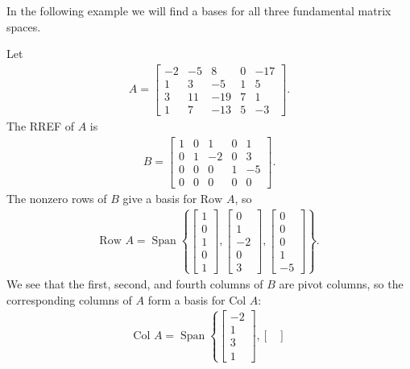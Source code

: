 \documentclass[12pt,letterpaper,reqno]{article}
\numberwithin{equation}{section}
\newcommand{\Col}{\text{Col }}
\newcommand{\Row}{\text{Row }}
\DeclareMathOperator{\Span}{Span}
\begin{document}
In the following example we will find a bases for all three fundamental matrix spaces.
\begin{example}
Let 
\begin{align*}
	A=\begin{bmatrix}
		-2 & -5 & 8 & 0 & -17 \\
		1 & 3 & -5 & 1 & 5 \\
		3 & 11 & -19 & 7 & 1 \\
		1 & 7 & -13 & 5 & -3
	\end{bmatrix}.
\end{align*}	
The RREF of $A$ is
\begin{align*}
	B=\begin{bmatrix}
		1 & 0 & 1 & 0 & 1 \\
		0 & 1 & -2 & 0 & 3 \\
		0 & 0 & 0 & 1 & -5 \\
		0 & 0 & 0 & 0 & 0
	\end{bmatrix}.
\end{align*}
The nonzero rows of $B$ give a basis for $\Row A$, so
\begin{align*}
	\Row A=\Span\left\{\begin{bmatrix}
		1 \\ 0 \\ 1 \\ 0 \\ 1
	\end{bmatrix}, \begin{bmatrix}
		0 \\ 1 \\ -2 \\ 0 \\ 3
	\end{bmatrix}, \begin{bmatrix}
		0 \\ 0 \\ 0\\ 1 \\ -5
	\end{bmatrix}\right\}.
\end{align*}
We see that the first, second, and fourth columns of $B$ are pivot columns, so the corresponding columns of $A$ form a basis for $\Col A$:
\begin{align*}
	\Col A=\Span \left\{\begin{bmatrix}
		-2 \\ 1  \\ 3 \\ 1
	\end{bmatrix}, \begin{bmatrix}

\end{bmatrix}
\end{align*}
\end{example}
\end{document}
